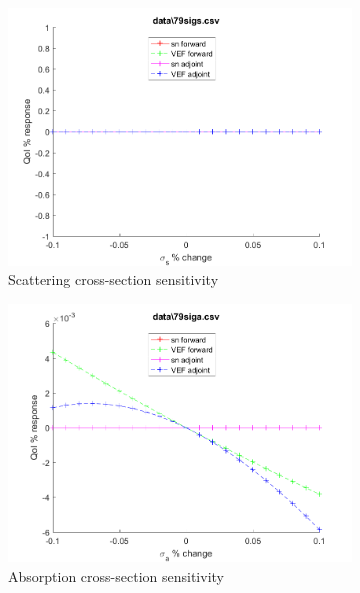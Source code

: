 \documentclass{article}
\begin{document}
\begin{figure}[H]
\begin{subfigure}{.5\textwidth}
  \includegraphics[width=.98\linewidth]{IanProposal/figures2/79sigsSens.png}
  \caption{Scattering cross-section sensitivity}
  \label{fig:sfig2}
\end{subfigure}%
\begin{subfigure}{.5\textwidth}
  \centering
  \includegraphics[width=.98\linewidth]{IanProposal/figures2/79sigaSens.png}
  \caption{Absorption cross-section sensitivity}
  \label{fig:sfig5}
\end{subfigure}%
\caption{}
\label{fig:fig}
\end{figure}
\newpage

\end{document}
